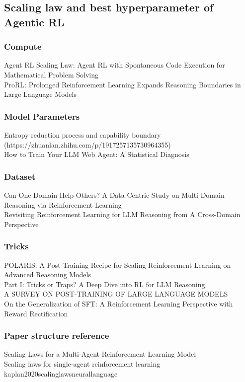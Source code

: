     \subsection{Scaling law and best hyperparameter of Agentic RL}
        \subsubsection{Compute}
        \cite{mai2025agentrlscalinglaw} Agent RL Scaling Law: Agent RL with Spontaneous Code Execution for Mathematical Problem Solving\\
        \cite{liu2025prorlprolongedreinforcementlearning}ProRL: Prolonged Reinforcement Learning Expands Reasoning Boundaries in Large Language Models        

        \subsubsection{Model Parameters}
        \cite{ziqidonglai2025reasoningLLM5}Entropy reduction process and capability boundary (https://zhuanlan.zhihu.com/p/1917257135730964355)\\
        \cite{vattikonda2025trainllmwebagent}How to Train Your LLM Web Agent: A Statistical Diagnosis

        \subsubsection{Dataset}
        \cite{li2025domainhelpothersdatacentric}Can One Domain Help Others? A Data-Centric Study on Multi-Domain Reasoning via Reinforcement Learning\\
        \cite{cheng2025revisitingreinforcementlearningllm}Revisiting Reinforcement Learning for LLM Reasoning from A Cross-Domain Perspective


        \subsubsection{Tricks}
        \cite{Polaris2025}POLARIS: A Post-Training Recipe for Scaling Reinforcement Learning on Advanced Reasoning Models\\
        \cite{liu2025itrickstrapsdeep}Part I: Tricks or Traps? A Deep Dive into RL for LLM Reasoning\\
        \cite{tie2025surveyposttraininglargelanguage}A SURVEY ON POST-TRAINING OF LARGE LANGUAGE MODELS\\
        \cite{wu2025generalizationsftreinforcementlearning}On the Generalization of SFT: A Reinforcement Learning Perspective with Reward Rectification

        \subsubsection{Paper structure reference}
        \cite{neumann2023scaling}Scaling Laws for a Multi-Agent Reinforcement Learning Model\\
        \cite{hilton2023scalinglawssingleagentreinforcement} Scaling laws for single-agent reinforcement learning\\
        \cite{kaplan2020scalinglawsneurallanguage}kaplan2020scalinglawsneurallanguage